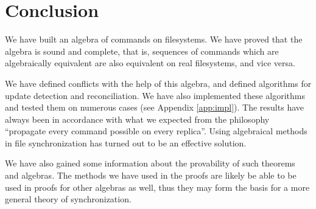 \section{Conclusion}

We have built an algebra of commands on filesystems. We have proved that the
algebra is sound and complete, that is, sequences of commands which are algebraically
equivalent are also equivalent on real filesystems, and vice
versa.

We have defined conflicts with the help of this algebra, and defined
algorithms for update detection and reconciliation. We have also
implemented these algorithms and tested them on numerous cases (see
Appendix \ref{app:impl}). The results have always been in accordance with what
we expected from the philosophy ``propagate every command possible on
every replica''.  Using algebraical methods in file
synchronization has turned out to be an effective solution.

We have also gained some information about the provability of such theorems and
algebras. The methods we have used in the proofs are likely be able to be used
in proofs for other algebras as well, thus they may form the basis for
a more general theory of synchronization.


